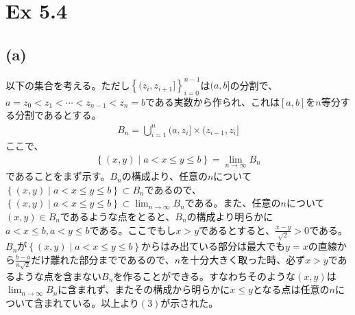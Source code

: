 \documentclass{article}
\begin{document}
\section{Ex 5.4}
\subsection{(a)}
以下の集合を考える。ただし$\left\{ (z_i ,z_{i+1}] \right\}_{i = 0}^{n-1}$は$(a, b]$の分割で、$a = z_0 < z_1 < \cdots < z_{n-1} < z_n = b$である実数から作られ、これは$[a,b]$を$n$等分する分割であるとする。
\begin{align*}
	B_n = \bigcup_{i = 1}^n (a, z_i] \times (z_{i-1}, z_i]
\end{align*}
ここで、
\begin{align}
	\left\{ (x, y) \mid a < x \leq y \leq b \right\} = \lim_{n\to \infty} B_n
\end{align}
であることをまず示す。$B_n$の構成より、任意の$n$について$\left\{ (x, y) \mid a < x \leq y \leq b \right\} \subset B_n$であるので、$\left\{ (x, y) \mid a < x \leq y \leq b \right\} \subset \lim_{n\to \infty} B_n$である。また、任意の$n$について$(x, y) \in B_n$であるような点をとると、$B_n$の構成より明らかに$a < x \leq b, a < y \leq b$である。ここでもし$x > y$であるとすると、$\frac{x-y}{\sqrt{2}} > 0$である。$B_n$が$\left\{ (x, y) \mid a < x \leq y \leq b \right\}$からはみ出ている部分は最大でも$y = x$の直線から$\frac{b-a}{n\sqrt{2}}$だけ離れた部分までであるので、$n$を十分大きく取った時、必ず$x > y$であるような点を含まない$B_n$を作ることができる。すなわちそのような$(x, y)$は$\lim_{n\to \infty} B_n$に含まれず、またその構成から明らかに$x\leq y$となる点は任意の$n$について含まれている。以上より$(3)$が示された。
\end{document}
